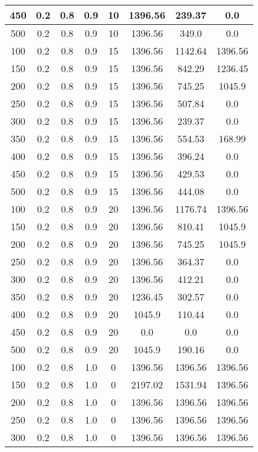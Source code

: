 \documentclass[a4paper, 12pt]{extreport}
\begin{document}
\begin{itemize}
\begin{longtable}{|c|c|c|c|c|c|c|c|}
			450 & 0.2 & 0.8 & 0.9 & 10 & 1396.56 & 239.37 & 0.0 \\\hline
			500 & 0.2 & 0.8 & 0.9 & 10 & 1396.56 & 349.0 & 0.0 \\\hline
			100 & 0.2 & 0.8 & 0.9 & 15 & 1396.56 & 1142.64 & 1396.56 \\\hline
			150 & 0.2 & 0.8 & 0.9 & 15 & 1396.56 & 842.29 & 1236.45 \\\hline
			200 & 0.2 & 0.8 & 0.9 & 15 & 1396.56 & 745.25 & 1045.9 \\\hline
			250 & 0.2 & 0.8 & 0.9 & 15 & 1396.56 & 507.84 & 0.0 \\\hline
			300 & 0.2 & 0.8 & 0.9 & 15 & 1396.56 & 239.37 & 0.0 \\\hline
			350 & 0.2 & 0.8 & 0.9 & 15 & 1396.56 & 554.53 & 168.99 \\\hline
			400 & 0.2 & 0.8 & 0.9 & 15 & 1396.56 & 396.24 & 0.0 \\\hline
			450 & 0.2 & 0.8 & 0.9 & 15 & 1396.56 & 429.53 & 0.0 \\\hline
			500 & 0.2 & 0.8 & 0.9 & 15 & 1396.56 & 444.08 & 0.0 \\\hline
			100 & 0.2 & 0.8 & 0.9 & 20 & 1396.56 & 1176.74 & 1396.56 \\\hline
			150 & 0.2 & 0.8 & 0.9 & 20 & 1396.56 & 810.41 & 1045.9 \\\hline
			200 & 0.2 & 0.8 & 0.9 & 20 & 1396.56 & 745.25 & 1045.9 \\\hline
			250 & 0.2 & 0.8 & 0.9 & 20 & 1396.56 & 364.37 & 0.0 \\\hline
			300 & 0.2 & 0.8 & 0.9 & 20 & 1396.56 & 412.21 & 0.0 \\\hline
			350 & 0.2 & 0.8 & 0.9 & 20 & 1236.45 & 302.57 & 0.0 \\\hline
			400 & 0.2 & 0.8 & 0.9 & 20 & 1045.9 & 110.44 & 0.0 \\\hline
			450 & 0.2 & 0.8 & 0.9 & 20 & 0.0 & 0.0 & 0.0 \\\hline
			500 & 0.2 & 0.8 & 0.9 & 20 & 1045.9 & 190.16 & 0.0 \\\hline
			100 & 0.2 & 0.8 & 1.0 & 0 & 1396.56 & 1396.56 & 1396.56 \\\hline
			150 & 0.2 & 0.8 & 1.0 & 0 & 2197.02 & 1531.94 & 1396.56 \\\hline
			200 & 0.2 & 0.8 & 1.0 & 0 & 1396.56 & 1396.56 & 1396.56 \\\hline
			250 & 0.2 & 0.8 & 1.0 & 0 & 1396.56 & 1396.56 & 1396.56 \\\hline
			300 & 0.2 & 0.8 & 1.0 & 0 & 1396.56 & 1396.56 & 1396.56 \\\hline

\end{longtable}
\end{itemize}
\end{document}

